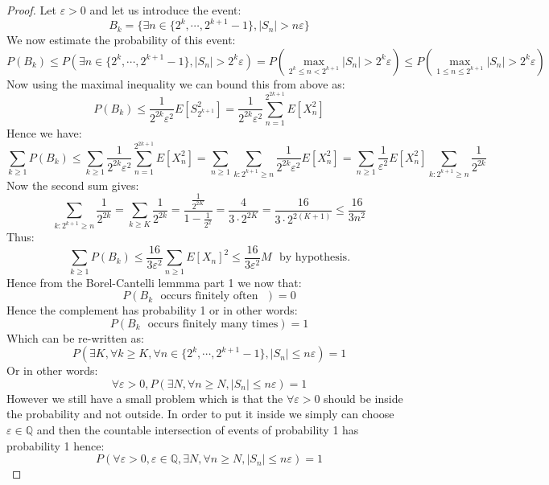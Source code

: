 \documentclass[10pt,a4paper]{book}
\theoremstyle{definition}
\begin{document}
\begin{proof}
Let $\varepsilon > 0$ and let us introduce the event:
\[
B_k = \{ \exists n \in \{2^k, \cdots, 2^{k+1} - 1\}, |S_n| > n \varepsilon\}
\]
We now estimate the probability of this event:
\[
P(B_k) \leq P(\exists n \in \{2^k, \cdots, 2^{k+1} - 1\}, |S_n| > 2^k \varepsilon) = P(\max_{2^k \leq n < 2^{k+1}} |S_n| > 2^k \varepsilon) \leq P(\max_{1 \leq n \leq 2^{k + 1}} |S_n| > 2^k \varepsilon)
\]
Now using the maximal inequality we can bound this from above as:
\[
P(B_k) \leq \frac{1}{2^{2k} \varepsilon^2} E[S_{2^{k+1}}^2] = \frac{1}{2^{2k} \varepsilon^2} \sum_{n = 1}^{2^{2k + 1}} E[X_n^2]
\]
Hence we have:
\[
\sum_{k \geq 1} P(B_k) \leq \sum_{k \geq 1} \frac{1}{2^{2k} \varepsilon^2} \sum_{n = 1}^{2^{2k + 1}} E[X_n^2] = \sum_{n \geq 1} \sum_{k : 2^{k + 1} \geq n} \frac{1}{2^{2k} \varepsilon^2} E[X_n^2] = \sum_{n \geq 1} \frac{1}{\varepsilon^2} E[X_n^2] \sum_{k : 2^{k+1} \geq n} \frac{1}{2^{2k}}
\]
Now the second sum gives:
\[
\sum_{k : 2^{k+1} \geq n} \frac{1}{2^{2k}} = \sum_{k \geq K} \frac{1}{2^{2k}} = \frac{\frac{1}{2^{2K}}}{1 - \frac{1}{2^2}} = \frac{4}{3 \cdot 2^{2K}} = \frac{16}{3 \cdot 2^{2(K+1)}} \leq \frac{16}{3 n^2}
\]
Thus:
\[
\sum_{k \geq 1} P(B_k) \leq \frac{16}{3 \varepsilon^2} \sum_{n \geq 1} E[X_n]^2 \leq \frac{16}{3 \varepsilon^2} M \mbox{~~by hypothesis.}
\]
Hence from the Borel-Cantelli lemmma part 1 we now that:
\[
P(B_k \mbox{~~occurs finitely often~~}) = 0
\]
Hence the complement has probability 1 or in other words:
\[
P(B_k \mbox{~~occurs finitely many times}) = 1
\]
Which can be re-written as:
\[
P(\exists K, \forall k \geq K, \forall n \in \{ 2^k, \cdots, 2^{k+1} - 1\}, |S_n| \leq n\varepsilon) = 1
\]
Or in other words:
\[
\forall \varepsilon > 0, P(\exists N, \forall n \geq N, |S_n| \leq n\varepsilon) = 1
\]
However we still have a small problem which is that the $\forall \varepsilon > 0$ should be inside the probability and not outside. In order to put it inside we simply can choose $\varepsilon \in \mathbb{Q}$ and then the countable intersection of events of probability 1 has probability 1 hence:
\[
P(\forall \varepsilon > 0, \varepsilon \in\mathbb{Q}, \exists N, \forall n \geq N, |S_n| \leq n \varepsilon) = 1
\]
\end{proof}
\end{document}
